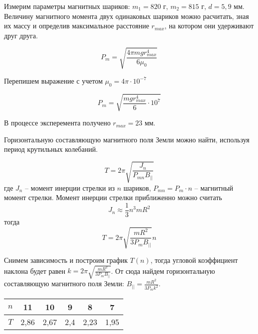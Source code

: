 


    

    Измерим параметры магнитных шариков: $m_1 = 820$ г, $m_2 = 815$ г, $d = 5,9$ мм.\\
    Величину магнитного момента двух одинаковых шариков можно расчитать, зная их массу и определив
    максимальное расстояние $r_{max}$, на котором они удерживают друг друга.

    \begin{equation*}
        P_m = \sqrt{\frac{4 \pi mg r_{max}^4}{6 \mu_0}}
    \end{equation*}

    Перепишем выражение с учетом $\mu_0 = 4 \pi \cdot 10^{-7}$

    \begin{equation*}
        P_m = \sqrt{\frac{mg r_{max}^4}{6} \cdot 10^7}
    \end{equation*}

    В процессе эксперемента получено $r_{max} = 23$ мм.

    \begin{center}
    \end{center}

    Горизонтальную составляющую магнитного поля Земли можно найти, используя период крутильных колебаний.

    \begin{equation*}
        T = 2 \pi \sqrt{\frac{J_n}{P_{mn} B_{||}}}
    \end{equation*}
    где $J_n$ -- момент инерции стрелки из $n$ шариков, $P_{mn} = P_m \cdot n$ -- магнитный момент стрелки.
    Момент инерции стрелки приближенно можно считать
    \begin{equation*}
        J_n \approx \frac{1}{3} n^3 m R^2
    \end{equation*} 
    тогда
    \begin{equation*}
        T = 2 \pi \sqrt{\frac{m R^2}{3 P_m B_{||}}} n
    \end{equation*}

    Снимем зависимость и построим график $T(n)$, тогда угловой коэффициент наклона будет равен $k = 2 \pi \sqrt{\frac{m R^2}{3 P_m B_{||}}}$.
    От сюда найдем горизонтальную составляющую магнитного поля Земли: $B_{||} = \frac{m R^2}{3 P_m k^2}$.

    \begin{table}[h!]
        \begin{center}
            \begin{tabular}{|c|c|c|c|c|c|}
                \hline
                $n$ & 11   & 10   & 9   & 8    & 7    \\ \hline
                $T$ & 2,86 & 2,67 & 2,4 & 2,23 & 1,95 \\ \hline
            \end{tabular}
        \end{center}
    \end{table}

